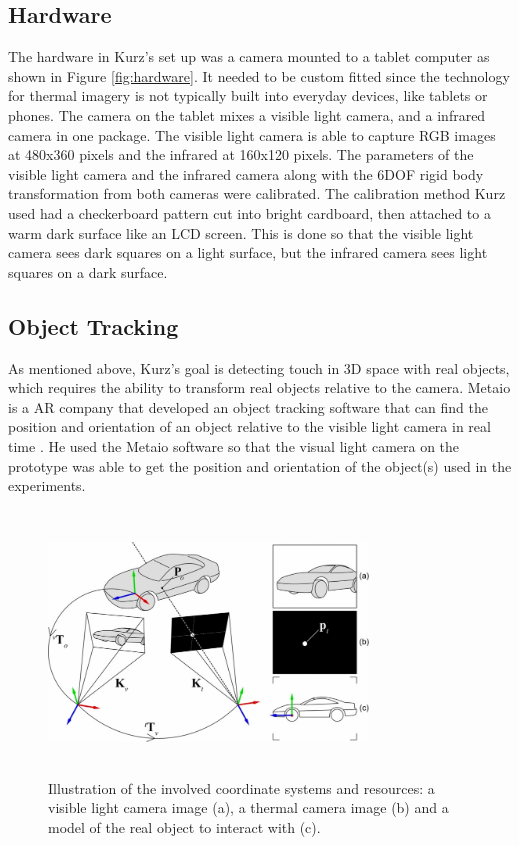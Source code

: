 \documentclass{sig-alternate}
\begin{document}
\subsection{Hardware}
\label{Hardware}
The hardware in Kurz's \cite{Thermal} set up was a camera mounted to a tablet computer as shown in Figure \ref{fig:hardware}. It needed to be custom fitted since the technology for thermal imagery is not typically built into everyday devices, like tablets or phones. The camera on the tablet mixes a visible light camera, and a infrared camera in one package. The visible light camera is able to capture RGB images at 480x360 pixels and the infrared at 160x120 pixels. The parameters of the visible light camera and the infrared camera along with the 6DOF rigid body transformation from both cameras were calibrated. The calibration method Kurz used had a checkerboard pattern cut into bright cardboard, then attached to a warm dark surface like an LCD screen. This is done so that the visible light camera sees dark squares on a light surface, but the infrared camera sees light squares on a dark surface.


\subsection{Object Tracking}
\label{Object Tracking}
As mentioned above,  Kurz's goal is detecting touch in 3D space with real objects, which requires the ability to transform real objects relative to the camera. Metaio is a AR company that developed an object tracking software that can find the position and orientation of an object relative to the visible light camera in real time \cite{Thermal}. He used the Metaio software so that the visual light camera on the prototype was able to get the position and orientation of the object(s) used in the experiments.     

\begin{figure}
	\includegraphics[width=8.5cm, height=7cm]{Tracking}
	\caption{Illustration of the involved coordinate systems and resources: a visible light camera image (a), a thermal camera image (b) and a model of the real object to interact with (c).\cite{Thermal}}
	\label{fig:Tracking}
\end{figure}
\end{document}
